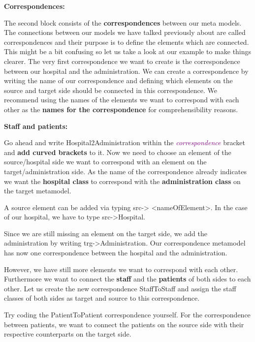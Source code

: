 \textbf{Correspondences:}

The second block consists of the \textbf{correspondences} between our meta models. The connections between our models we have talked previously about are called correspondences and their purpose is to define the elements which are connected. This might be a bit confusing so let us take a look at our example to make things clearer. The very first correspondence we want to create is the correspondence between our hospital and the administration. We can create a correspondence by writing the name of our correspondence and defining which elements on the source and target side should be connected in this correspondence. We recommend using the names of the elements we want to correspond with each other as the \textbf{names for the correspondence} for comprehensibility reasons.\newline

\textbf{Staff and patients:}

Go ahead and write \textsf{Hospital2Administration} within the \textcolor{Purple}{\textit{correspondence}} bracket and \textbf{add curved brackets} to it.
Now we need to choose an element of the source/hospital side we want to correspond with an element on the target/administration side. As the name of the correspondence already indicates we want the \textbf{hospital class} to correspond with the \textbf{administration class} on the target metamodel.

A source element can be added via typing \textsf{src-> <nameOfElement>}. In the case of our hospital, we have to type \textsf{src->Hospital}.

Since we are still missing an element on the target side, we add the administration by writing \textsf{trg->Administration}. Our correspondence metamodel has now one correspondence between the hospital and the administration.\newline

However, we have still more elements we want to correspond with each other. Furthermore we want to connect the \textbf{staff} and the \textbf{patients} of both sides to each other. Let us create the new correspondence \textsf{StaffToStaff} and assign the staff classes of both sides as target and source to this correspondence.\newline

Try coding the \textsf{PatientToPatient} correspondence yourself. For the correspondence between patients, we want to connect the patients on the source side with their respective counterparts on the target side.\newline

